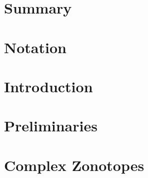 \documentclass[11pt,a4paper,twoside,openright]{book}
\begin{document}
\pagestyle{empty}


\frontmatter
\pagestyle{plain}

% 
% 
% 
\chapter{Summary} 
% 
% 
\cleardoublepage
{}
\tableofcontents
\listofalgorithms

\chapter*{Notation} 

\mainmatter 
\pagestyle{fancy}

\chapter{Introduction} \label{ch:intro} 
%
\chapter{Preliminaries} \label{ch:review} 
% 
\chapter{Complex Zonotopes} \label{ch:tcz} 
%
\end{document}
